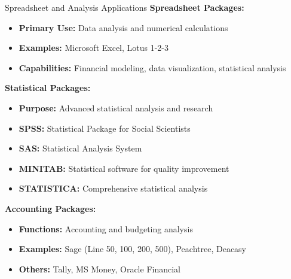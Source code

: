 \documentclass[aspectratio=169]{beamer}
\begin{document}
\begin{frame}{Spreadsheet and Analysis Applications}
    \textbf{Spreadsheet Packages:}
    \begin{itemize}
        \item \textbf{Primary Use:} Data analysis and numerical calculations
        \item \textbf{Examples:} Microsoft Excel, Lotus 1-2-3
        \item \textbf{Capabilities:} Financial modeling, data visualization, statistical analysis
    \end{itemize}
    
    \vspace{0.3cm}
    \textbf{Statistical Packages:}
    \begin{itemize}
        \item \textbf{Purpose:} Advanced statistical analysis and research
        \item \textbf{SPSS:} Statistical Package for Social Scientists
        \item \textbf{SAS:} Statistical Analysis System
        \item \textbf{MINITAB:} Statistical software for quality improvement
        \item \textbf{STATISTICA:} Comprehensive statistical analysis
    \end{itemize}
    
    \vspace{0.3cm}
    \textbf{Accounting Packages:}
    \begin{itemize}
        \item \textbf{Functions:} Accounting and budgeting analysis
        \item \textbf{Examples:} Sage (Line 50, 100, 200, 500), Peachtree, Deacasy
        \item \textbf{Others:} Tally, MS Money, Oracle Financial
    \end{itemize}
\end{frame}
\end{document}
